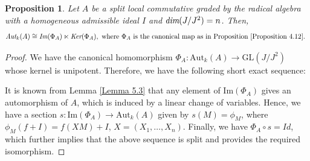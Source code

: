 \documentclass[12pt]{amsart}
\newtheorem{proposition}[theorem]{Proposition}
\theoremstyle{definition}
\numberwithin{equation}{section}
\begin{document}
\vskip2mm
\begin{proposition}\label{Proposition 5.4}
Let $A$ be a split local commutative graded by the radical algebra with a homogeneous admissible ideal $I$ and $\emph{dim}(J/J^2)=n$. Then, \[\emph{\text{Aut}}_k(A)\cong \emph{\text{Im}}(\Phi_A)\ltimes \emph{\text{Ker}}(\Phi_A), \text{ where $\Phi_A$ is the canonical map as in Proposition \ref{Proposition 4.12}. }\]
\end{proposition}
\vskip1mm
\begin{proof}
We have the canonical homomorphism $\Phi_A: \text{Aut}_k(A)\rightarrow \text{GL}(J/J^2)$ whose kernel is unipotent. Therefore, we have the following short exact sequence: 
\begin{center}
\end{center}
It is known from Lemma \ref{Lemma 5.3} that any element of $\text{Im}(\Phi_A)$ gives an automorphism of $A$, which is induced by a linear change of variables. Hence, we have a section $s: \text{Im}(\Phi_A)\rightarrow \text{Aut}_k(A)$ given by $s(M)=\phi_M$, where $\phi_M(f+I)=f(XM)+I$, $X=(X_1,\dots,X_n)$. Finally, we have $\Phi_A\circ s=Id$, which further implies that the above sequence is split and provides the required isomorphism.
\end{proof}
\end{document}
